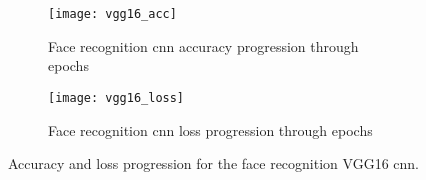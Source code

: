 \begin{figure}[H]
	\centering
	\begin{subfigure}{0.48\textwidth}
		\centering
		\texttt{[image: vgg16\_acc]}
		\caption{Face recognition \gls{cnn} accuracy progression through epochs}
		\label{fig:vgg16_acc}
	\end{subfigure}
	\begin{subfigure}{0.48\textwidth}
		\centering
		\texttt{[image: vgg16\_loss]}
		\caption{Face recognition \gls{cnn} loss progression through epochs}
		\label{fig:vgg16_loss}
	\end{subfigure}
	\caption{Accuracy and loss progression for the face recognition VGG16 \gls{cnn}.}
	\label{fig:vgg_graphs}
\end{figure}
